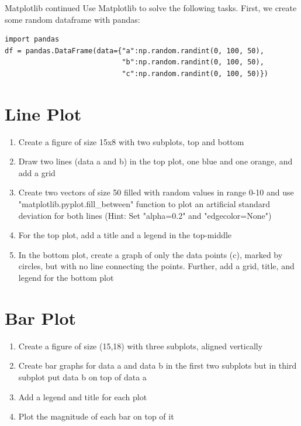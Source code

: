 \documentclass[twoside]{article}
\begin{document}
\clearpage
\begin{task}{Matplotlib continued}{}{}
Use Matplotlib to solve the following tasks.
First, we create some random dataframe with pandas:
\begin{lstlisting}[numbers=none]
import pandas
df = pandas.DataFrame(data={"a":np.random.randint(0, 100, 50),
                            "b":np.random.randint(0, 100, 50),
                            "c":np.random.randint(0, 100, 50)})
\end{lstlisting}

\section{Line Plot}
\begin{enumerate}
    \item Create a figure of size 15x8 with two subplots, top and bottom
    \item Draw two lines (data a and b) in the top plot, one blue and one orange, and add a grid
    \item Create two vectors of size 50 filled with random values in range 0-10 and use "matplotlib.pyplot.fill\_between" function to plot an artificial standard deviation for both lines (Hint: Set "alpha=0.2" and "edgecolor=None")
    \item For the top plot, add a title and a legend in the top-middle
    \item In the bottom plot, create a graph of only the data points (c), marked by circles, but with no line connecting the points. Further, add a grid, title, and legend for the bottom plot
\end{enumerate}

\section{Bar Plot}
\begin{enumerate}
    \item Create a figure of size (15,18) with three subplots, aligned vertically
    \item Create bar graphs for data a and data b in the first two subplots but in third subplot put data b on top of data a
    \item Add a legend and title for each plot
    \item Plot the magnitude of each bar on top of it
\end{enumerate}

\end{task}
\end{document}
